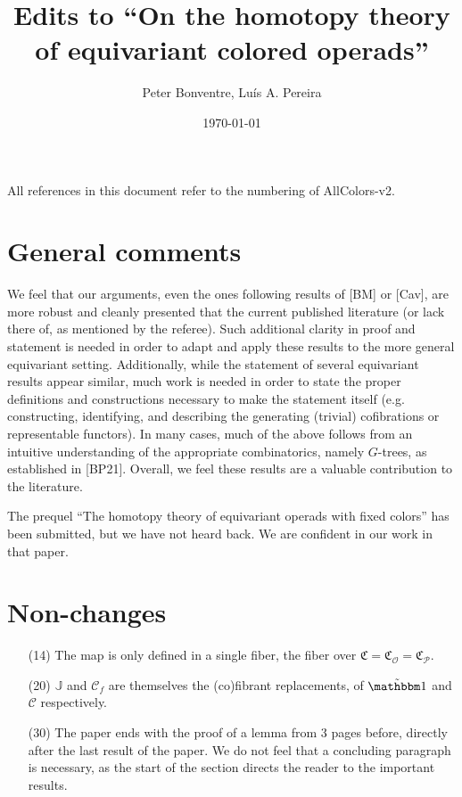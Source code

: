 \documentclass[a4paper,10pt
]{article}%
\title{Edits to ``On the homotopy theory of equivariant colored operads''}
\author{Peter Bonventre, Lu\'is A. Pereira}%
\date{\today}
\numberwithin{equation}{section}
\numberwithin{figure}{section}
\theoremstyle{definition} %
\renewcommand{\O}{\ensuremath{\mathcal O}}
\renewcommand{\P}{\ensuremath{\mathcal P}}
\newcommand{\1}{\ensuremath{\mathbbm 1}}%
\begin{document}
 
  
\maketitle
 


All references in this document refer to the numbering of AllColors-v2.



\section{General comments}

We feel that
our arguments, even the ones following results of [BM] or [Cav], are more robust and cleanly presented that the current published literature (or lack there of, as mentioned by the referee).
Such additional clarity in proof and statement is needed in order to adapt and apply these results to the more general equivariant setting.
Additionally, while the statement of several equivariant results appear similar, much work is needed in order to state the proper definitions and constructions necessary to make the statement itself
(e.g. constructing, identifying, and describing the generating (trivial) cofibrations or representable functors).
In many cases, much of the above follows from an intuitive understanding of the appropriate combinatorics, namely $G$-trees,
as established in [BP21].
Overall, we feel these results are a valuable contribution to the literature.

The prequel ``The homotopy theory of equivariant operads with fixed colors'' has been submitted, but we have not heard back.
We are confident in our work in that paper.

      

\section{Non-changes}

\begin{enumerate}
\item[(14)] The map is only defined in a single fiber, the fiber over $\mathfrak C = \mathfrak C_\O = \mathfrak C_\P$.
\item[(20)] $\mathbb J$ and $\mathcal C_f$ are themselves the (co)fibrant replacements, of $\tilde{\mathbbm 1}$ and $\mathcal C$ respectively.
\item[(30)] The paper ends with the proof of a lemma from 3 pages before, directly after the last result of the paper. We do not feel that a concluding paragraph is necessary, as the start of the section directs the reader to the important results.
\end{enumerate}
\end{document}
